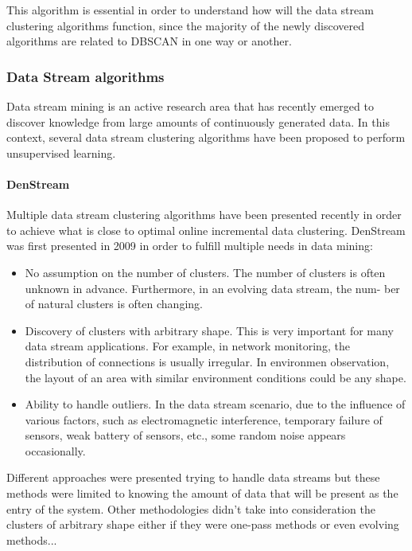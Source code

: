\documentclass[]{article}
\begin{document}
This algorithm is essential in order to understand how will the data stream clustering algorithms function, since the majority of the newly discovered algorithms are related to DBSCAN in one way or another.



\subsubsection{Data Stream algorithms}
Data stream mining is an active research area that has recently emerged to discover knowledge from large amounts of continuously generated data. In this context, several data stream clustering algorithms have been proposed to perform unsupervised learning.

\paragraph{DenStream}

Multiple data stream clustering algorithms have been presented recently in order to achieve what is close to optimal online incremental data clustering. DenStream\cite{cao2006density} was first presented in 2009 in order to fulfill multiple needs in data mining:
\begin{itemize}
	\item No assumption on the number of clusters.  The number of clusters is often unknown in advance. Furthermore, in an evolving data stream, the num-
	ber of natural clusters is often changing.
	\item Discovery of clusters with arbitrary shape.  This	is very important for many data stream applications. For example, in network monitoring, the
	distribution of connections is usually irregular. In environmen observation, the layout of an area with similar environment conditions could be any shape.
	\item Ability to handle outliers.  In the data stream scenario, due to the influence of various factors, such as electromagnetic interference, temporary failure of sensors, weak battery of sensors, etc., some random noise appears occasionally.
\end{itemize}

Different approaches were presented trying to handle data streams\cite{hinneburg1998efficient}\cite{wang1997sting}\cite{aggarwal2004framework} but these methods were limited to knowing the amount of data that will be present as the entry of the system. Other methodologies didn't take into consideration the clusters of arbitrary shape either if they were one-pass methods\cite{charikar2003better}\cite{guha2003clustering}\cite{guha2003clustering} or even evolving methods\cite{aggarwal2003framework}...
\end{document}
